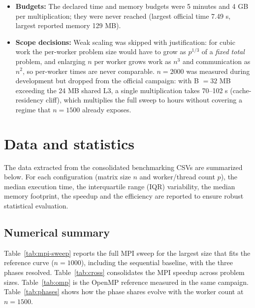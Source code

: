 \documentclass[12pt,a4paper]{article}
\begin{document}
\begin{itemize}
reported: Scatterv $n^2 \cdot 8 \cdot (p-1)/p$, Bcast
$n^2 \cdot 8 \cdot (p-1)$, Gatherv $n^2 \cdot 8 \cdot (p-1)/p$ (for
$n = 1500$, $p = 22$ this is $\approx$412 MB, of which $\approx$378 MB is
the broadcast of B).
\item \textbf{Budgets:} The declared time and memory budgets were 5 minutes
and 4 GB per multiplication; they were never reached (largest official time
7.49 s, largest reported memory 129 MB).
\item \textbf{Scope decisions:} Weak scaling was skipped with justification:
for cubic work the per-worker problem size would have to grow as $p^{1/3}$
of a \emph{fixed total} problem, and enlarging $n$ per worker grows work as
$n^3$ and communication as $n^2$, so per-worker times are never comparable.
$n = 2000$ was measured during development but dropped from the official
campaign: with B $= 32$ MB exceeding the 24 MB shared L3, a single
multiplication takes 70--102 s (cache-residency cliff), which multiplies the
full sweep to hours without covering a regime that $n = 1500$ already
exposes.
\end{itemize}

\section{Data and statistics}
\label{sec:data}

The data extracted from the consolidated benchmarking CSVs are summarized
below. For each configuration (matrix size $n$ and worker/thread count $p$),
the median execution time, the interquartile range (IQR) variability, the
median memory footprint, the speedup and the efficiency are reported to
ensure robust statistical evaluation.

\subsection{Numerical summary}
\label{sec:numsummary}

Table~\ref{tab:mpi-sweep} reports the full MPI sweep for the largest size
that fits the reference curve ($n = 1000$), including the sequential
baseline, with the three phases resolved. Table~\ref{tab:cross} consolidates
the MPI speedup across problem sizes. Table~\ref{tab:omp} is the OpenMP
reference measured in the same campaign. Table~\ref{tab:phases} shows how the
phase shares evolve with the worker count at $n = 1500$.
\end{document}
